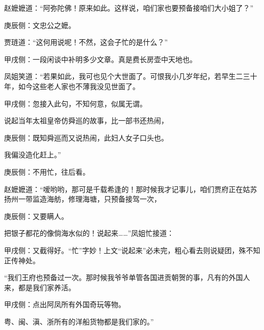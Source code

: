 \begin{parag}
    赵嬷嬷道：“阿弥陀佛！原来如此。这样说，咱们家也要预备接咱们大小姐了？”\begin{note}庚辰侧：文忠公之嬷。\end{note}贾琏道：“这何用说呢！不然，这会子忙的是什么？”\begin{note}甲戌侧：一段闲谈中补明多少文章。真是费长房壶中天地也。\end{note}凤姐笑道：“若果如此，我可也见个大世面了。可恨我小几岁年纪，若早生二三十年，如今这些老人家也不薄我没见世面了。\begin{note}甲戌侧：忽接入此句，不知何意，似属无谓。\end{note}说起当年太祖皇帝仿舜巡的故事，比一部书还热闹，\begin{note}庚辰侧：既知舜巡而又说热闹，此妇人女子口头也。\end{note}我偏没造化赶上。”\begin{note}庚辰侧：不用忙，往后看。\end{note}赵嬷嬷道：“嗳哟哟，那可是千载希逢的！那时候我才记事儿，咱们贾府正在姑苏扬州一带监造海舫，修理海塘，只预备接驾一次，\begin{note}庚辰侧：又要瞒人。\end{note}把银子都花的像倘海水似的！说起来……”凤姐忙接道：\begin{note}甲戌侧：又截得好。“忙”字妙！上文“说起来”必未完，粗心看去则说疑团，殊不知正传神处。\end{note}“我们王府也预备过一次。那时候我爷爷单管各国进贡朝贺的事，凡有的外国人来，都是我们家养活。\begin{note}甲戌侧：点出阿凤所有外国奇玩等物。\end{note}粤、闽、滇、浙所有的洋船货物都是我们家的。”
\end{parag}


